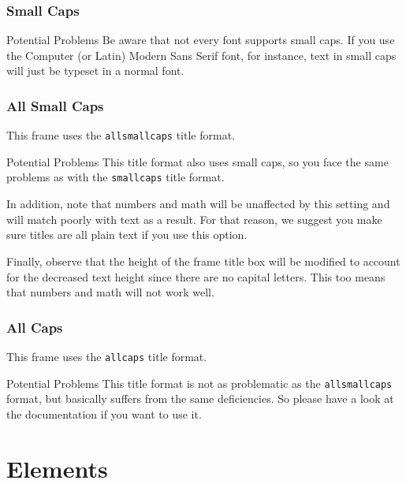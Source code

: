 \documentclass[10pt]{beamer}
\begin{document}
{
\begin{frame}
  \frametitle{Small Caps}

  \begin{alertblock}{Potential Problems}
    Be aware that not every font supports small caps. If you use the Computer (or Latin) Modern Sans Serif font, for instance, text in small caps will just be typeset in a normal font.
  \end{alertblock}
\end{frame}
}

{
\begin{frame}
  \frametitle{All Small Caps}
  This frame uses the \texttt{allsmallcaps} title format.

  \begin{alertblock}{Potential Problems}
    This title format also uses small caps, so you face the same problems as with the \texttt{smallcaps} title format.

    \medskip

    In addition, note that numbers and math will be unaffected by this setting and will match
    poorly with text as a result. For that reason, we suggest you make sure titles are all
    plain text if you use this option.

    \medskip

    Finally, observe that the height of the frame title box will be modified to account for the
    decreased text height since there are no capital letters. This too means that numbers and
    math will not work well.
  \end{alertblock}
\end{frame}
}

{
\begin{frame}
  \frametitle{All Caps}
  This frame uses the \texttt{allcaps} title format.

  \begin{alertblock}{Potential Problems}
    This title format is not as problematic as the \texttt{allsmallcaps} format, but basically suffers from the same deficiencies. So please have a look at the documentation if you want to use it.
  \end{alertblock}
\end{frame}
}

\section{Elements}
\end{document}
